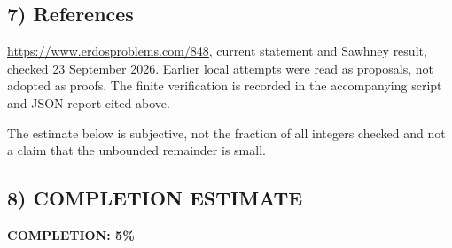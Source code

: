 \subsection*{7) References}
\url{https://www.erdosproblems.com/848}, current statement and Sawhney result, checked 23 September 2026. Earlier local attempts were read as proposals, not adopted as proofs. The finite verification is recorded in the accompanying script and JSON report cited above.

The estimate below is subjective, not the fraction of all integers checked and not a claim that the unbounded remainder is small.
\subsection*{8) COMPLETION ESTIMATE}
\textbf{COMPLETION: 5\%}
